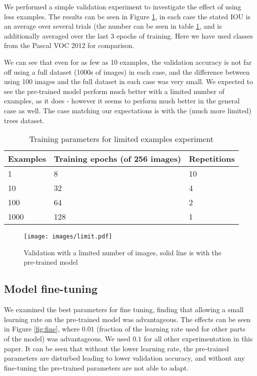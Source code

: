 \documentclass{IEEEtran}
\begin{document}
We performed a simple validation experiment to investigate the effect of using less examples. The results can be seen in Figure \ref{fig:limited}, in each case the stated IOU is an average over several trials (the number can be seen in table \ref{fig:limit_params}, and is additionally averaged over the last 3 epochs of training. Here we have used classes from the Pascal VOC 2012 for comparison.

We can see that even for as few as 10 examples, the validation accuracy is not far off using a full dataset (1000s of images) in each case, and the difference between using 100 images and the full dataset in each case was very small. We expected to see the pre-trained model perform much better with a limited number of examples, as it does - however it seems to perform much better in the general case as well. The case matching our expectations is with the (much more limited) trees dataset.


\begin{table}[ht]
  \centering
    \caption{Training parameters for limited examples experiment}

  \begin{tabular}{ l  l  l}
    Examples & Training epochs (of 256 images) & Repetitions \\
    \toprule
    1 	  & 8 	& 10 \\
    10 	  & 32 	& 4  \\
    100   & 64 	& 2 \\
    1000  & 128 & 1 \\
    \bottomrule
  \end{tabular}
\label{fig:limit_params}
\end{table}



\begin{figure}[ht]
\centering
\texttt{[image: images/limit.pdf]}
\caption{Validation with a limited number of images, solid line is with the pre-trained model}  
\label{fig:limited}
\end{figure}



\subsection{Model fine-tuning}

We examined the best parameters for fine tuning, finding that allowing a small learning rate on the pre-trained model was advantageous. The effects can be seen in Figure \ref{fig:fine}, where $0.01$ (fraction of the learning rate used for other parts of the model) was advantageous. We used $ 0.1 $ for all other experimentation in this paper. It can be seen that without the lower learning rate, the pre-trained parameters are disturbed leading to lower validation accuracy, and without any fine-tuning the pre-trained parameters are not able to adapt.
\end{document}
